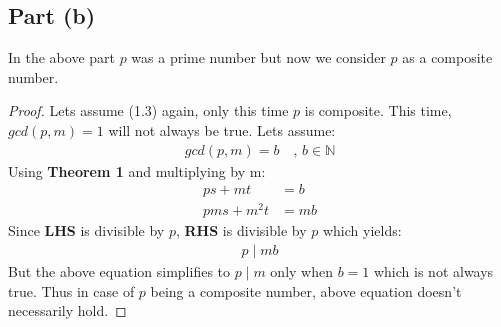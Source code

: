 \documentclass{article}
\begin{document}
{    \subsection{Part (b)}{
      In the above part $p$ was a prime number but now we consider $p$ as a composite number.
      \begin{proof}
        Lets assume (1.3) again, only this time $p$ is composite.
        This time, $gcd(p,m)=1$ will not always be true.
        Lets assume:
        \begin{align*}
          gcd(p,m)=b \quad,\, b \in \mathbb{N}
        \end{align*}
        Using \textbf{Theorem 1} and multiplying by m:
        \begin{align*}
          ps+mt&=b \\
          pms+m^2t&=mb
        \end{align*}
        Since \textbf{LHS} is divisible by $p$, \textbf{RHS} is divisible by $p$ which yields:
        \begin{align*}
          p \mid mb
        \end{align*}
        But the above equation simplifies to $p \mid m$ only when $b=1$ which is not always true. Thus in case of $p$ being a composite number, above equation doesn't necessarily hold.
      \end{proof}
    }
}
\end{document}
